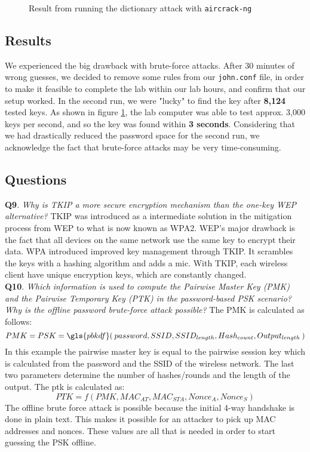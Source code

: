 \documentclass[a4paper,11pt]{article}
\begin{document}
\begin{figure}[h!]
\centering
{}
\caption{\label{fig:result2} Result from running the dictionary attack with \texttt{aircrack-ng}}
\end{figure}

\subsection{Results}

\noindent We experienced the big drawback with brute-force attacks. After 30 minutes of wrong guesses, we decided to remove some rules from our \texttt{john.conf} file, in order to make it feasible to complete the lab within our lab hours, and confirm that our setup worked. In the second run, we were "lucky" to find the key after \textbf{8,124} tested keys. As shown in figure \ref{fig:result2}, the lab computer was able to test approx. 3,000 keys per second, and so the key was found within \textbf{3 seconds}. Considering that we had drastically reduced the password space for the second run, we acknowledge the fact that brute-force attacks may be very time-consuming.

\subsection{Questions}

\noindent\textbf{Q9}. \textit{Why is TKIP a more secure encryption mechanism than the one-key WEP alternative?}
\noindent TKIP was introduced as a intermediate solution in the mitigation process from WEP to what is now known as WPA2. WEP's major drawback is the fact that all devices on the same network use the same key to encrypt their data. WPA introduced improved key management through TKIP. It scrambles the keys with a hashing algorithm and adds a \gls{mic}. With TKIP, each wireless client have unique encryption keys, which are constantly changed\cite{iee802}.\\

\noindent\textbf{Q10}. \textit{Which information is used to compute the Pairwise Master Key (PMK) and the Pairwise Temporary Key (PTK) in the password-based PSK scenario? Why is the offline password brute-force attack possible?} The PMK is calculated as follows: \[PMK = PSK = \gls{pbkdf}(\: password, SSID, SSID_{length}, Hash_{count}, Output_{length}\:) \]
In this example the pairwise master key is equal to the pairwise session key which is calculated from the password and the SSID of the wireless network. The last two parameters determine the number of hashes/rounds and the length of the output. The \gls{ptk} is calculated as: \[ PTK = f(PMK, MAC_{AT}, MAC_{STA}, Nonce_A, Nonce_S) \]
\noindent The offline brute force attack is possible because the initial 4-way handshake is done in plain text. This makes it possible for an attacker to pick up MAC addresses and nonces. These values are all that is needed in order to start guessing the PSK offline. \\
\end{document}
